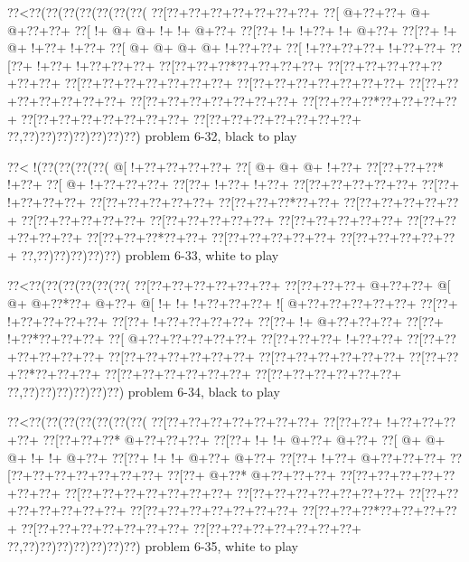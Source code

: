 \vbox{\vbox{\goo
\0??<\0??(\0??(\0??(\0??(\0??(\0??(\0??(
\0??[\0??+\0??+\0??+\0??+\0??+\0??+\0??+
\0??[\- @+\0??+\0??+\- @+\- @+\0??+\0??+
\0??[\- !+\- @+\- @+\- !+\- !+\- @+\0??+
\0??[\0??+\- !+\- !+\0??+\- !+\- @+\0??+
\0??[\0??+\- !+\- @+\- !+\0??+\- !+\0??+
\0??[\- @+\- @+\- @+\- @+\- !+\0??+\0??+
\0??[\- !+\0??+\0??+\0??+\- !+\0??+\0??+
\0??[\0??+\- !+\0??+\- !+\0??+\0??+\0??+
\0??[\0??+\0??+\0??*\0??+\0??+\0??+\0??+
\0??[\0??+\0??+\0??+\0??+\0??+\0??+\0??+
\0??[\0??+\0??+\0??+\0??+\0??+\0??+\0??+
\0??[\0??+\0??+\0??+\0??+\0??+\0??+\0??+
\0??[\0??+\0??+\0??+\0??+\0??+\0??+\0??+
\0??[\0??+\0??+\0??+\0??+\0??+\0??+\0??+
\0??[\0??+\0??+\0??*\0??+\0??+\0??+\0??+
\0??[\0??+\0??+\0??+\0??+\0??+\0??+\0??+
\0??[\0??+\0??+\0??+\0??+\0??+\0??+\0??+
\0??,\0??)\0??)\0??)\0??)\0??)\0??)\0??)
}
\hfil problem 6-32, black to play\hfil\break
}

\vbox{\vbox{\goo
\0??<\- !(\0??(\0??(\0??(\0??(
\- @[\- !+\0??+\0??+\0??+\0??+
\0??[\- @+\- @+\- @+\- !+\0??+
\0??[\0??+\0??+\0??*\- !+\0??+
\0??[\- @+\- !+\0??+\0??+\0??+
\0??[\0??+\- !+\0??+\- !+\0??+
\0??[\0??+\0??+\0??+\0??+\0??+
\0??[\0??+\- !+\0??+\0??+\0??+
\0??[\0??+\0??+\0??+\0??+\0??+
\0??[\0??+\0??+\0??*\0??+\0??+
\0??[\0??+\0??+\0??+\0??+\0??+
\0??[\0??+\0??+\0??+\0??+\0??+
\0??[\0??+\0??+\0??+\0??+\0??+
\0??[\0??+\0??+\0??+\0??+\0??+
\0??[\0??+\0??+\0??+\0??+\0??+
\0??[\0??+\0??+\0??*\0??+\0??+
\0??[\0??+\0??+\0??+\0??+\0??+
\0??[\0??+\0??+\0??+\0??+\0??+
\0??,\0??)\0??)\0??)\0??)\0??)
}
\hfil problem 6-33, white to play\hfil\break
}

\vbox{\vbox{\goo
\0??<\0??(\0??(\0??(\0??(\0??(\0??(
\0??[\0??+\0??+\0??+\0??+\0??+\0??+
\0??[\0??+\0??+\0??+\- @+\0??+\0??+
\- @[\- @+\- @+\0??*\0??+\- @+\0??+
\- @[\- !+\- !+\- !+\0??+\0??+\0??+
\- ![\- @+\0??+\0??+\0??+\0??+\0??+
\0??[\0??+\- !+\0??+\0??+\0??+\0??+
\0??[\0??+\- !+\0??+\0??+\0??+\0??+
\0??[\0??+\- !+\- @+\0??+\0??+\0??+
\0??[\0??+\- !+\0??*\0??+\0??+\0??+
\0??[\- @+\0??+\0??+\0??+\0??+\0??+
\0??[\0??+\0??+\0??+\- !+\0??+\0??+
\0??[\0??+\0??+\0??+\0??+\0??+\0??+
\0??[\0??+\0??+\0??+\0??+\0??+\0??+
\0??[\0??+\0??+\0??+\0??+\0??+\0??+
\0??[\0??+\0??+\0??*\0??+\0??+\0??+
\0??[\0??+\0??+\0??+\0??+\0??+\0??+
\0??[\0??+\0??+\0??+\0??+\0??+\0??+
\0??,\0??)\0??)\0??)\0??)\0??)\0??)
}
\hfil problem 6-34, black to play\hfil\break
}

\vbox{\vbox{\goo
\0??<\0??(\0??(\0??(\0??(\0??(\0??(\0??(
\0??[\0??+\0??+\0??+\0??+\0??+\0??+\0??+
\0??[\0??+\0??+\- !+\0??+\0??+\0??+\0??+
\0??[\0??+\0??+\0??*\- @+\0??+\0??+\0??+
\0??[\0??+\- !+\- !+\- @+\0??+\- @+\0??+
\0??[\- @+\- @+\- @+\- !+\- !+\- @+\0??+
\0??[\0??+\- !+\- !+\- @+\0??+\- @+\0??+
\0??[\0??+\- !+\0??+\- @+\0??+\0??+\0??+
\0??[\0??+\0??+\0??+\0??+\0??+\0??+\0??+
\0??[\0??+\- @+\0??*\- @+\0??+\0??+\0??+
\0??[\0??+\0??+\0??+\0??+\0??+\0??+\0??+
\0??[\0??+\0??+\0??+\0??+\0??+\0??+\0??+
\0??[\0??+\0??+\0??+\0??+\0??+\0??+\0??+
\0??[\0??+\0??+\0??+\0??+\0??+\0??+\0??+
\0??[\0??+\0??+\0??+\0??+\0??+\0??+\0??+
\0??[\0??+\0??+\0??*\0??+\0??+\0??+\0??+
\0??[\0??+\0??+\0??+\0??+\0??+\0??+\0??+
\0??[\0??+\0??+\0??+\0??+\0??+\0??+\0??+
\0??,\0??)\0??)\0??)\0??)\0??)\0??)\0??)
}
\hfil problem 6-35, white to play\hfil\break
}

